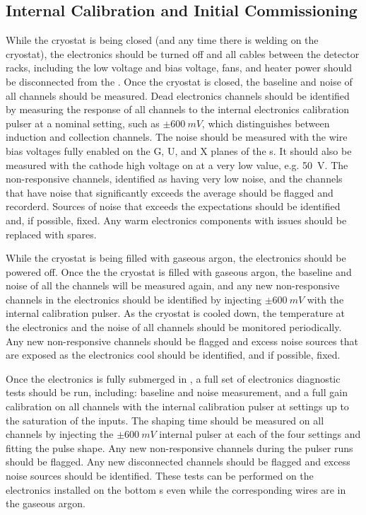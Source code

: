 \subsection{Internal Calibration and Initial Commissioning}
\label{sec:fdsp-tpcelec-integration-calib}

While the cryostat is being closed (and any time there is welding 
on the cryostat), the electronics should be turned off and all 
cables between the detector racks, including the low voltage
and bias voltage, fans, and heater power should be disconnected 
from the . Once the cryostat is closed, the baseline 
and noise of all channels should be measured. Dead electronics channels 
should be identified by measuring the response of all channels to 
the internal electronics calibration pulser at a nominal setting, 
such as $\pm\SI{600}{mV}$, which distinguishes between induction 
and collection channels. The noise should be measured with the wire bias 
voltages fully enabled on the G, U, and X planes of the s. 
It should also be measured with the cathode high voltage on at a very 
low value, e.g. \SI{50}{V}. The non-responsive channels, identified
as having very low noise, and the channels that have noise that 
significantly exceeds the average should be flagged and recorderd.
Sources of noise that exceeds the expectations should be identified
and, if possible, fixed. Any warm electronics components with
issues should be replaced with spares.

While the cryostat is being filled with gaseous argon, the electronics 
should be powered off. Once the the cryostat is filled with gaseous
argon, the baseline and noise of all the channels will be measured
again, and any new non-responsive channels in the electronics 
should be identified by injecting $\pm\SI{600}{mV}$ with the 
internal calibration pulser. As the cryostat is cooled down, the 
temperature at the electronics and the noise of all channels should 
be monitored periodically. Any new non-responsive channels should 
be flagged and excess noise sources that are exposed as the 
electronics cool should be identified, and if possible, fixed.

Once the electronics is fully submerged in , a full 
set of electronics diagnostic tests should be run, including: 
baseline and noise measurement, and a full gain calibration on 
all channels with the internal calibration pulser at settings 
up to the saturation of the  inputs. The shaping time 
should be measured on all channels by injecting the $\pm\SI{600}{mV}$
internal pulser at each of the four settings and fitting the 
pulse shape. Any new non-responsive channels during the pulser 
runs should be flagged. Any new disconnected channels should be 
flagged and excess noise sources should be identified. These tests 
can be performed on the electronics installed on the bottom
s even while the corresponding wires are in 
the gaseous argon.


